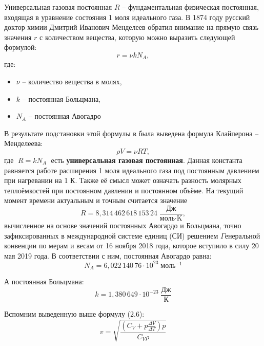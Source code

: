 \documentclass[referat,times]{SCWorks}
\begin{document}
Универсальная газовая постоянная $R$ -- фундаментальная физическая постоянная, входящая в уравнение состояния 1 моля идеального газа.
В 1874 году русский доктор химии Дмитрий Иванович Менделеев обратил внимание на прямую связь значения $r$ с количеством вещества\cite{MENDELEEV_UPRUGOST_TOCHNOST}, которую можно выразить следующей формулой:
\begin{equation}
    r = \nu k N_A,
\end{equation}
где:
\begin{itemize}
    \item $\nu$ -- количество вещества в молях,
    \item $k$ -- постоянная Больцмана,
    \item $N_A$ -- постоянная Авогадро
\end{itemize}
В результате подстановки этой формулы в была выведена формула Клайперона -- Менделеева:
\begin{equation}
    \rho V = \nu R T,
\end{equation}
где $\;R = k N_A\;$ есть \textbf{универсальная газовая постоянная}. Данная константа равняется работе расширения 1 моля идеального газа под постоянным давлением при нагревании на 1 К\cite{SIVUHIN_PHYSICS}. Также её смысл может означать разность молярных теплоёмкостей при постоянном давлении и постоянном объёме. На текущий момент времени актуальным и точным считается значение
\begin{equation}
    R = 8,314\,462\,618\,153\,24 \; \frac{\text{Дж}}{\text{моль} \cdot \text{K}},
\end{equation}
вычисленное на основе значений постоянных Авогардо и Больцмана, точно зафиксированных в международной системе единиц (СИ) решением $\Gamma$енеральной конвенции по мерам и весам от 16 ноября 2018 года\cite{CGPM_2018}, которое вступило в силу 20 мая 2019 года. В соответствии с ним, постоянная Авогардо равна:
\begin{equation}
    N_A = 6,022\,140\, 76 \cdot 10^{23} \; \text{моль}^{-1}
\end{equation}
\par А постоянная Больцмана:
\begin{equation}
    k = 1,380\, 649 \cdot 10^{-23} \; \frac{\text{Дж}}{\text{К}}
\end{equation}
\par Вспомним выведенную выше формулу (2.6):
\begin{equation*}
    v = \sqrt{\frac{(C_V + p \frac{\Delta V}{\Delta T}) p}{C_V \rho}}
\end{equation*}
\end{document}
